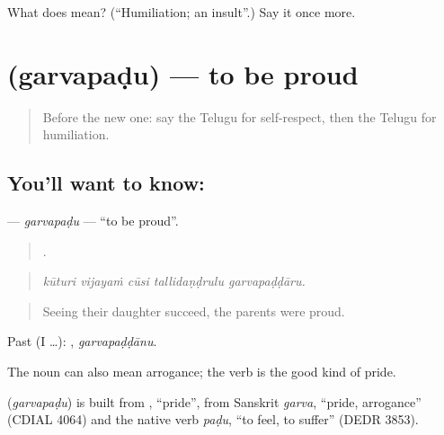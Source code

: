 \begin{tcolorbox}[breakable,colback=teal!4,colframe=teal!35!black,title={Before you move on}]
What does  mean? (\textquotedblleft{}Humiliation; an insult\textquotedblright{}.) Say it once more.
\end{tcolorbox}
\section[\texorpdfstring{\te{గర్వపడు} (garvapaḍu)}{గర్వపడు (garvapaḍu)}]{ (garvapaḍu) — to be proud}

\label{lesson:TE-C498-garvapadu}



\begin{quote}
Before the new one: say the Telugu for self-respect, then the Telugu for humiliation.
\end{quote}

\subsection*{You'll want to know: }
\textbf{} — \emph{garvapaḍu} — \textquotedblleft{}to be proud\textquotedblright{}.

\begin{quote}
    .
\end{quote}

\begin{quote}
\emph{kūturi vijayaṁ cūsi tallidaṇḍrulu garvapaḍḍāru.}
\end{quote}

\begin{quote}
Seeing their daughter succeed, the parents were proud.
\end{quote}

Past (I …): , \emph{garvapaḍḍānu}.

The noun  can also mean arrogance; the verb is the good kind of pride.

\begin{cousinweb}
\textbf{} (\emph{garvapaḍu}) is built from , \textquotedblleft{}pride\textquotedblright{}, from Sanskrit \emph{garva}, \textquotedblleft{}pride, arrogance\textquotedblright{} (CDIAL 4064) and the native verb \emph{paḍu}, \textquotedblleft{}to feel, to suffer\textquotedblright{} (DEDR 3853).
\end{cousinweb}

